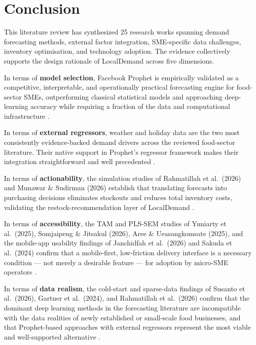 \documentclass[conference]{IEEEtran}
\begin{document}
\section{Conclusion}

This literature review has synthesized 25 research works spanning
demand forecasting methods, external factor integration, SME-specific
data challenges, inventory optimisation, and technology adoption. The
evidence collectively supports the design rationale of LocalDemand across
five dimensions.

In terms of \textbf{model selection}, Facebook Prophet is empirically
validated as a competitive, interpretable, and operationally practical
forecasting engine for food-sector SMEs, outperforming classical
statistical models and approaching deep-learning accuracy while requiring
a fraction of the data and computational infrastructure
\cite{jatte2025, aqila2026, kamboj2025, guler}.

In terms of \textbf{external regressors}, weather and holiday data are
the two most consistently evidence-backed demand drivers across the
reviewed food-sector literature. Their native support in Prophet's
regressor framework makes their integration straightforward and well
precedented \cite{guler, kamboj2025, groene_zakharov, lalitha2025,
jain2024}.

In terms of \textbf{actionability}, the simulation studies of Rahmatillah
et al.\ (2026) and Munawar \& Sudirman (2026) establish that translating
forecasts into purchasing decisions eliminates stockouts and reduces
total inventory costs, validating the restock-recommendation layer of
LocalDemand \cite{rahmatillah2026, munawar2026}.

In terms of \textbf{accessibility}, the TAM and PLS-SEM studies of
Yuniarty et al.\ (2025), Somjaipeng \& Jitsakul (2026), Aree \&
Ueasangkomsate (2025), and the mobile-app usability findings of
Janchidfah et al.\ (2026) and Sakuda et al.\ (2024) confirm that
a mobile-first, low-friction delivery interface is a necessary condition
--- not merely a desirable feature --- for adoption by micro-SME
operators \cite{yuniarty2025, somjaipeng2026, aree2025,
janchidfah2026, sakuda2024}.

In terms of \textbf{data realism}, the cold-start and sparse-data
findings of Susanto et al.\ (2026), Gartner et al.\ (2024), and
Rahmatillah et al.\ (2026) confirm that the dominant deep learning
methods in the forecasting literature are incompatible with the data
realities of newly established or small-scale food businesses, and
that Prophet-based approaches with external regressors represent the
most viable and well-supported alternative \cite{susanto2026,
gartner2024, rahmatillah2026}.
\end{document}
